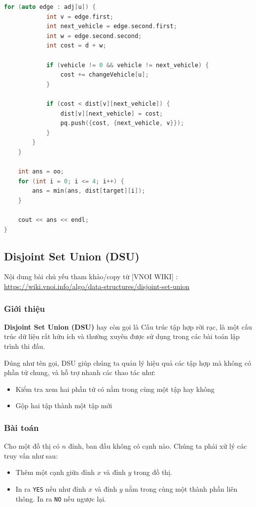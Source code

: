 \documentclass{article}
\begin{document}
\begin{lstlisting}[language=C++, caption={Cài đặt}]
        for (auto edge : adj[u]) {
            int v = edge.first;
            int next_vehicle = edge.second.first;
            int w = edge.second.second;
            int cost = d + w;

            if (vehicle != 0 && vehicle != next_vehicle) {
                cost += changeVehicle[u];
            }

            if (cost < dist[v][next_vehicle]) {
                dist[v][next_vehicle] = cost;
                pq.push({cost, {next_vehicle, v}});
            }
        }
    }

    int ans = oo;
    for (int i = 0; i <= 4; i++) {
        ans = min(ans, dist[target][i]);
    }

    cout << ans << endl;
}
\end{lstlisting}
\subsection{Disjoint Set Union (DSU)}

Nội dung bài chủ yếu tham khảo/copy từ [VNOI WIKI] : \url{https://wiki.vnoi.info/algo/data-structures/disjoint-set-union}

\subsubsection{Giới thiệu}

\textbf{Disjoint Set Union (DSU)} hay còn gọi là Cấu trúc tập hợp rời rạc, là một cấu trúc dữ liệu rất hữu ích và thường xuyên được sử dụng trong các bài toán lập trình thi đấu.

Đúng như tên gọi, DSU giúp chúng ta quản lý hiệu quả các tập hợp mà không có phần tử chung, và hỗ trợ nhanh các thao tác như:
\begin{itemize}
    \item Kiểm tra xem hai phần tử có nằm trong cùng một tập hay không
    \item Gộp hai tập thành một tập mới
\end{itemize}

\subsubsection{Bài toán}

Cho một đồ thị có $n$ đỉnh, ban đầu không có cạnh nào. Chúng ta phải xử lý các truy vấn như sau:

\begin{itemize}
    \item Thêm một cạnh giữa đỉnh $x$ và đỉnh $y$ trong đồ thị.
    \item In ra \texttt{YES} nếu như đỉnh $x$ và đỉnh $y$ nằm trong cùng một thành phần liên thông. In ra \texttt{NO} nếu ngược lại.
\end{itemize}
\end{document}
